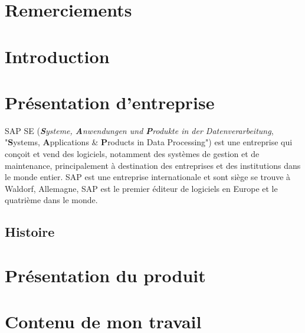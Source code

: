 \documentclass[12pt]{article}
\begin{document}
\setcounter{tocdepth}{3}
\tableofcontents
\pagebreak

\newpage
\section{Remerciements}

\newpage
\section{Introduction}


\newpage
\section{Présentation d'entreprise}
SAP SE (\textit{\textbf{S}ysteme, \textbf{A}nwendungen und \textbf{P}rodukte in der Datenverarbeitung}, "\textbf{S}ystems, \textbf{A}pplications \& \textbf{P}roducts in Data Processing") est une entreprise qui conçoit et vend des logiciels, notamment des systèmes de gestion et de maintenance, principalement à destination des entreprises et des institutions dans le monde entier. SAP est une entreprise internationale et sont siège se trouve à Waldorf, Allemagne, SAP est le premier éditeur de logiciels en Europe et le quatrième dans le monde.

\subsection{Histoire}

\newpage
\section{Présentation du produit}

\newpage
\section{Contenu de mon travail}


\end{document}
